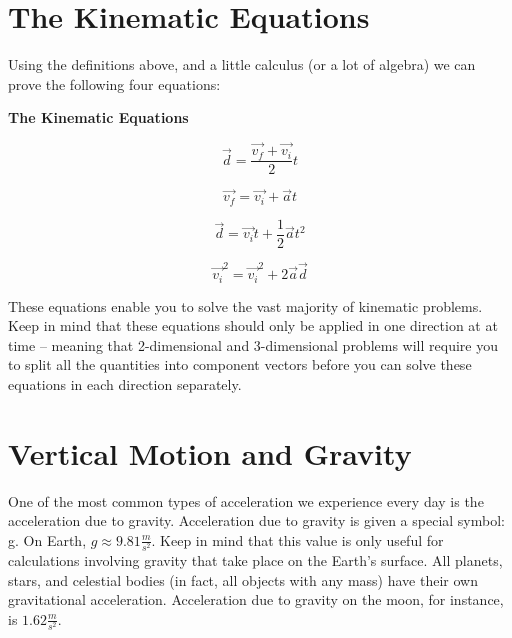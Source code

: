 \section{The Kinematic Equations} 
Using the definitions above, and a little calculus (or a lot of algebra) we can prove the following four equations:
\begin{mdframed}[backgroundcolor=orange!20!white]
	\begin{center}
		\textbf{The Kinematic Equations}
	\end{center}
	\begin{multicols}{2}
		\begin{equation}
		\vec{d} = \frac{\overrightarrow{v_f} + \overrightarrow{v_i}}{2}  t
		\label{equation:kinematic1}
		\end{equation}
			
		\begin{equation}
		\overrightarrow{v_f} = \overrightarrow{v_i} + \vec{a} t
		\label{equation:kinematic2}
		\end{equation}	
			
		\begin{equation}
		\vec{d} = \overrightarrow{v_i} t + \frac{1}{2}\vec{a}{t}^2
		\label{equation:kinematic3}
		\end{equation}
		
		\begin{equation}
		\overrightarrow{v_i}^2 = \overrightarrow{v_i}^2 + 2\vec{a}\vec{d}
		\label{equation:kinematic4}
		\end{equation}
		
		
			
		\end{multicols}
	\end{mdframed}

These equations enable you to solve the vast majority of kinematic problems.  Keep in mind that these equations should only be applied in one direction at at time – meaning that 2-dimensional and 3-dimensional problems will require you to split all the quantities into component vectors before you can solve these equations in each direction separately. 



\section{Vertical Motion and Gravity}

One of the most common types of acceleration we experience every day is the acceleration due to gravity.  Acceleration due to gravity is given a special symbol: g.  On Earth, $g \approx  9.81 \frac{m}{s^2}$.  Keep in mind that this value is only useful for calculations involving gravity that take place on the Earth's surface.  All planets, stars, and celestial bodies (in fact, all objects with any mass) have their own gravitational acceleration.  Acceleration due to gravity on the moon, for instance, is $1.62 \frac{m}{s^2}$.    

